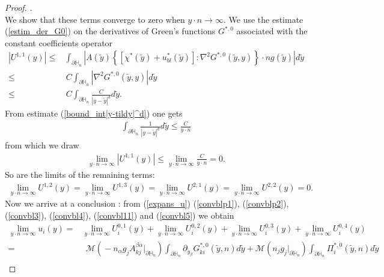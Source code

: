 \documentclass[11pt, reqno]{amsart}
\theoremstyle{definition}
\theoremstyle{remark}
\numberwithin{equation}{section}
\begin{document}
\begin{proof}[Proof]
		.\\ We show that these terms converge to zero when $y\cdot n \rightarrow \infty.$ 	We use the estimate (\ref{estim_der_G0}) on the derivatives of Green's functions $ G^{*,0}$ associated with the constant coefficients operator 
		\begin{align*}
			|U^{1,1}(y)|\leq &\int_{\partial\mathbb{H}_n}\left|A(\tilde{y}) \left\{\left[\chi^* \left(\tilde{y} \right)+ u_{bl}^*\left(\tilde{y} \right)\right]:\nabla^2 G^{*,0}\left(\tilde{y},y\right)\right\}\cdot n  g(\tilde{y})   \right|   d\tilde{y} \\
			\leq & \, C\int_{\partial\mathbb{H}_n}\left|\nabla^2 G^{*,0}\left(\tilde{y},y\right)  \right|   d\tilde{y} \\
			\leq & \,  C\int_{\partial\mathbb{H}_n}\frac{C}{|y-\tilde{y}|^{d}}   d\tilde{y}.
		\end{align*}
		From estimate	(\ref{bound_int|y-tildy|^d}) one gets
		\begin{align*}
			\int_{\partial\mathbb{H}_n}\frac{1}{|y-\tilde{y}|^{d}}   d\tilde{y}\leq \frac{C}{y\cdot n} 
		\end{align*}
		from which we  draw  
		\begin{align}
			\lim_{y\cdot n \rightarrow \infty} 	|U^{1,1}(y)|\leq  \lim_{y\cdot n \rightarrow \infty}  \frac{C}{y\cdot n} = 0.\label{convbl11}
		\end{align}
		So are the limits of the remaining terms:
		\begin{align}
			\lim_{y\cdot n \rightarrow \infty} 	U^{1,2}(y)= \lim_{y\cdot n \rightarrow \infty} 	U^{1,3}(y)  = 	\lim_{y\cdot n \rightarrow \infty} 	U^{2,1}(y)=	\lim_{y\cdot n \rightarrow \infty} 	U^{2,2}(y)=0\label{convbl5}.
		\end{align}
		Now we arrive at a conclusion : from  (\ref{expans_u})  (\ref{convblp1}), (\ref{convblp2}), (\ref{convbl3}), (\ref{convbl4}), (\ref{convbl11}) and (\ref{convbl5}) we obtain
		\begin{align*}
			\lim_{y\cdot n \rightarrow \infty} 	u_i(y)=& \lim_{y\cdot n \rightarrow \infty} 	U_i^{0,1}(y)  +	\lim_{y\cdot n \rightarrow \infty} 	U_i^{0,2}(y)+	\lim_{y\cdot n \rightarrow \infty} 	U_i^{0,3}(y)+	\lim_{y\cdot n \rightarrow \infty} 	U_i^{0,4}(y)\\
			=&\:\:	 \mathcal{M} \left(\! - n_\alpha g_j A^{\beta\alpha}_{kj} |_{\partial\mathbb{H}_n} \! \right)\!\!\int_{\partial\mathbb{H}_n}\!\! \partial_{\tilde{y}_\beta} G^{*,0}_{ki} \left(\tilde{y},n\right) d\tilde{y}+  \mathcal{M} \left( n_j g_j|_{\partial\mathbb{H}_n} \right)\!\!\int_{\partial\mathbb{H}_n}\!\!\! \Pi^{*,0}_i\left(\tilde{y},n\right) d\tilde{y}\\

\end{align*}
\end{proof}
\end{document}
